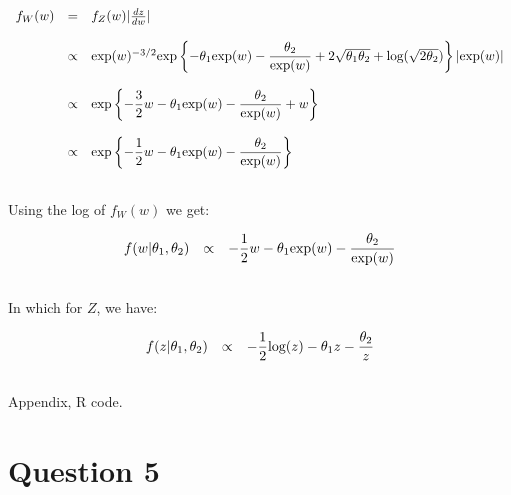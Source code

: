 \documentclass{article}
\begin{document}
\begin{equation*}
\begin{array}{lcl ll }

f_W(w) & = & f_Z(w)|\frac{dz}{dw}| \\\\

& \propto &  \mbox{exp}(w)^{-3/2} \mbox{exp} \left\{ -\theta_1  \mbox{exp}(w)   -\dfrac{\theta_2}{ \mbox{exp}(w) } + 2\sqrt{\theta_1\theta_2} + \mbox{log}(\sqrt{2\theta_2}) \right\} | \mbox{exp}(w)| \\ \\

& \propto &  \mbox{exp} \left\{ - \dfrac{3}{2}w-\theta_1  \mbox{exp}(w)   -\dfrac{\theta_2}{ \mbox{exp}(w)} + w  \right\} \\ \\

& \propto &  \mbox{exp} \left\{ - \dfrac{1}{2}w-\theta_1  \mbox{exp}(w)   -\dfrac{\theta_2}{ \mbox{exp}(w)} \right\} \\ \\

 \end{array}
\end{equation*}

Using the log of $f_W(w)$ we get:

\begin{equation*}
\begin{array}{lcl ll }

f(w|\theta_1,\theta_2) & \propto &  - \dfrac{1}{2}w-\theta_1  \mbox{exp}(w)   -\dfrac{\theta_2}{ \mbox{exp}(w)} \\ \\

 \end{array}
\end{equation*}

In which for $Z$, we have:

\begin{equation*}
\begin{array}{lcl ll }

f(z|\theta_1,\theta_2) & \propto &  - \dfrac{1}{2}\mbox{log}(z)-\theta_1 z   -\dfrac{\theta_2}{z} \\ \\

 \end{array}
\end{equation*}

Appendix, R code.

\section{Question 5}
\end{document}
